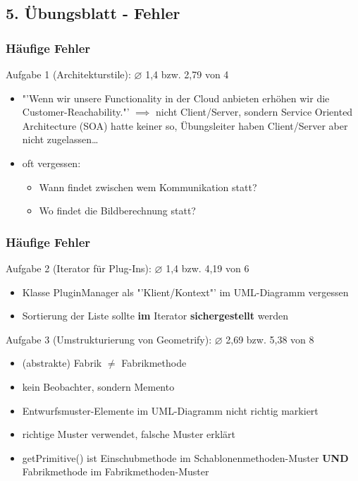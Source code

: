 \documentclass[18pt]{beamer}
\begin{document}
	\subsection{5. Übungsblatt - Fehler}
	\begin{frame}
		\frametitle{Häufige Fehler}
		\begin{block}{Aufgabe 1 (Architekturstile): $\diameter$ 1,4 bzw. 2,79 von 4}
			\begin{itemize}
				\pause 
				\item "'Wenn wir unsere Functionality in der Cloud anbieten erhöhen wir die Customer-Reachability."'
				\linebreak $\implies$ nicht Client/Server, sondern Service Oriented Architecture (SOA) \pause
				\linebreak hatte keiner so, Übungsleiter haben Client/Server aber nicht zugelassen\dots
				\item oft vergessen:
				\begin{itemize}
					\item Wann findet zwischen wem Kommunikation statt? 
					\item Wo findet die Bildberechnung statt?
				\end{itemize}
			\end{itemize}
		\end{block}
	\end{frame}

	\begin{frame}
		\frametitle{Häufige Fehler}
		\begin{block}{Aufgabe 2 (Iterator für Plug-Ins): $\diameter$ 1,4 bzw. 4,19 von 6}
			\begin{itemize}
				\pause 
				\item Klasse PluginManager als "'Klient/Kontext"' im UML-Diagramm vergessen \pause
				\item Sortierung der Liste sollte \textbf{im} Iterator \textbf{sichergestellt} werden
			\end{itemize}
		\end{block}
		\pause 
		\begin{block}{Aufgabe 3 (Umstrukturierung von Geometrify): $\diameter$ 2,69 bzw. 5,38 von 8}
			\begin{itemize}
				\item (abstrakte) Fabrik $\ne$ Fabrikmethode \pause
				\item  kein Beobachter, sondern Memento \pause
				\item Entwurfsmuster-Elemente im UML-Diagramm nicht richtig markiert \pause
				\item richtige Muster verwendet, falsche Muster erklärt \pause
				\item getPrimitive() ist Einschubmethode im Schablonenmethoden-Muster \textbf{UND} Fabrikmethode im Fabrikmethoden-Muster
			\end{itemize}
		\end{block}
	\end{frame}
\end{document}
